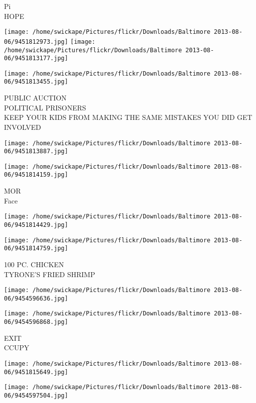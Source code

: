 \documentclass[10pt,letterpaper]{article}
\begin{document}
Pi\\
HOPE\\
\pagebreak

\texttt{[image: /home/swickape/Pictures/flickr/Downloads/Baltimore 2013-08-06/9451812973.jpg]}
\texttt{[image: /home/swickape/Pictures/flickr/Downloads/Baltimore 2013-08-06/9451813177.jpg]}

\texttt{[image: /home/swickape/Pictures/flickr/Downloads/Baltimore 2013-08-06/9451813455.jpg]}

PUBLIC AUCTION\\
POLITICAL PRISONERS\\
KEEP YOUR KIDS FROM MAKING THE SAME MISTAKES YOU DID GET INVOLVED\\
\pagebreak

\texttt{[image: /home/swickape/Pictures/flickr/Downloads/Baltimore 2013-08-06/9451813887.jpg]}

\vspace{0.25in}
\texttt{[image: /home/swickape/Pictures/flickr/Downloads/Baltimore 2013-08-06/9451814159.jpg]}

MOR\\
Face\\
\pagebreak

\texttt{[image: /home/swickape/Pictures/flickr/Downloads/Baltimore 2013-08-06/9451814429.jpg]}

\vspace{0.25in}
\texttt{[image: /home/swickape/Pictures/flickr/Downloads/Baltimore 2013-08-06/9451814759.jpg]}

100 PC. CHICKEN\\
TYRONE'S FRIED SHRIMP\\
\pagebreak

\texttt{[image: /home/swickape/Pictures/flickr/Downloads/Baltimore 2013-08-06/9454596636.jpg]}

\vspace{0.25in}
\texttt{[image: /home/swickape/Pictures/flickr/Downloads/Baltimore 2013-08-06/9454596868.jpg]}

EXIT\\
CCUPY\\
\pagebreak

\texttt{[image: /home/swickape/Pictures/flickr/Downloads/Baltimore 2013-08-06/9451815649.jpg]}

\vspace{0.25in}
\texttt{[image: /home/swickape/Pictures/flickr/Downloads/Baltimore 2013-08-06/9454597504.jpg]}
\end{document}
